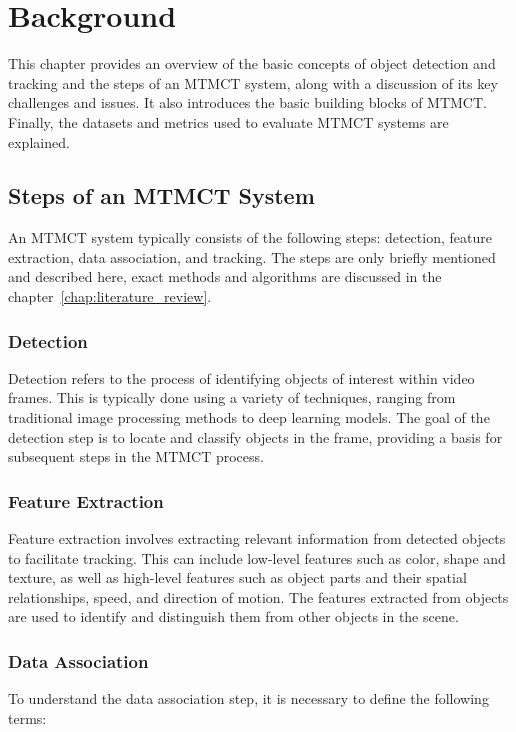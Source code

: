 \chapter{Background}\label{chap:background}
This chapter provides an overview of the basic concepts of object detection and tracking and the steps of an MTMCT system, along with a discussion of its key challenges and issues. It also introduces the basic building blocks of MTMCT. Finally, the datasets and metrics used to evaluate MTMCT systems are explained.

\section{Steps of an MTMCT System}\label{sec:steps_of_an_mtmct_system}
An MTMCT system typically consists of the following steps: detection, feature extraction, data association, and tracking. The steps are only briefly mentioned and described here, exact methods and algorithms are discussed in the chapter~\ref{chap:literature_review}.

\subsection{Detection}\label{subsec:detection}
Detection refers to the process of identifying objects of interest within video frames. This is typically done using a variety of techniques, ranging from traditional image processing methods to deep learning models. The goal of the detection step is to locate and classify objects in the frame, providing a basis for subsequent steps in the MTMCT process.

\subsection{Feature Extraction}\label{subsec:feature_extraction}
Feature extraction involves extracting relevant information from detected objects to facilitate tracking. This can include low-level features such as color, shape and texture, as well as high-level features such as object parts and their spatial relationships, speed, and direction of motion. The features extracted from objects are used to identify and distinguish them from other objects in the scene.

\subsection{Data Association}\label{subsec:data_association}
To understand the data association step, it is necessary to define the following terms:

